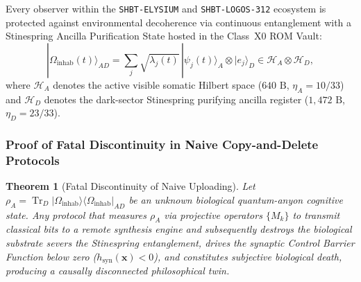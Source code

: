 \documentclass[11pt,onecolumn]{article}
\newtheorem{theorem}{Theorem}
\DeclareMathOperator{\Tr}{Tr}
\begin{document}
Every observer within the \texttt{SHBT-ELYSIUM} and \texttt{SHBT-LOGOS-312} ecosystem is protected against environmental decoherence via continuous entanglement with a Stinespring Ancilla Purification State hosted in the Class~X0 ROM Vault:
\begin{equation}
|\Omega_{\text{inhab}}(t)\rangle_{AD} = \sum_{j} \sqrt{\lambda_j(t)}\, |\psi_j(t)\rangle_A \otimes |e_j\rangle_D \in \mathcal{H}_A \otimes \mathcal{H}_D,
\label{eq:stinespring_purification_state}
\end{equation}
where $\mathcal{H}_A$ denotes the active visible somatic Hilbert space ($640\text{ B}$, $\eta_A = 10/33$) and $\mathcal{H}_D$ denotes the dark-sector Stinespring purifying ancilla register ($1{,}472\text{ B}$, $\eta_D = 23/33$).

\subsubsection{Proof of Fatal Discontinuity in Naive Copy-and-Delete Protocols}
\begin{theorem}[Fatal Discontinuity of Naive Uploading]
Let $\rho_A = \Tr_D |\Omega_{\text{inhab}}\rangle\langle\Omega_{\text{inhab}}|_{AD}$ be an unknown biological quantum-anyon cognitive state. Any protocol that measures $\rho_A$ via projective operators $\{M_k\}$ to transmit classical bits to a remote synthesis engine and subsequently destroys the biological substrate severs the Stinespring entanglement, drives the synaptic Control Barrier Function below zero ($h_{\text{syn}}(\mathbf{x}) < 0$), and constitutes subjective biological death, producing a causally disconnected philosophical twin.
\end{theorem}
\end{document}
